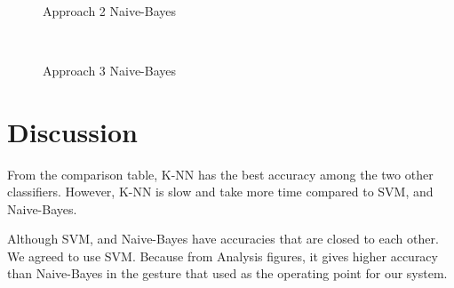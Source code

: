 \begin{figure}[h]
\begin{dBox}
\centering
 \mbox{
  }
  \caption{Approach 2 Naive-Bayes\label{fig:apr2_bayes} }
  
\end{dBox}   
\end{figure}
\begin{figure}[t]
\begin{dBox}
\centering
 \mbox{
  }
  \caption{Approach 3 Naive-Bayes\label{fig:apr3_bayes} } 
\end{dBox}   
\end{figure}


\section{Discussion}
From the comparison table, K-NN has the best accuracy among the two other classifiers. However, K-NN is slow and take more time compared to SVM, and Naive-Bayes.
\bigskip

Although SVM, and Naive-Bayes have accuracies that are closed to each other. We agreed to use SVM. Because from Analysis figures, it gives higher accuracy than Naive-Bayes in the gesture that used as the operating point for our system.
\bigskip
